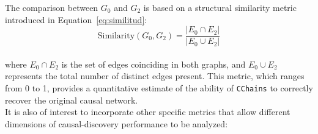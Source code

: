 \documentclass[12pt,a4paper]{report}
\begin{document}
The comparison between \( G_0 \) and \( G_2 \) is based on a structural similarity metric introduced in Equation~\ref{eq:similitud}:
\begin{equation}
\text{Similarity}(G_0, G_2) = \frac{|E_0 \cap E_2|}{|E_0 \cup E_2|}
\end{equation}
\\
where \( E_0 \cap E_2 \) is the set of edges coinciding in both graphs, and \( E_0 \cup E_2 \) represents the total number of distinct edges present. This metric, which ranges from 0 to 1, provides a quantitative estimate of the ability of \texttt{CChains} to correctly recover the original causal network.
\\

It is also of interest to incorporate other specific metrics that allow different dimensions of causal-discovery performance to be analyzed:
\end{document}
